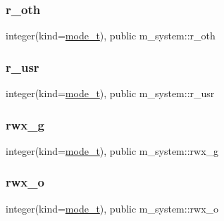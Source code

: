 \mbox{\label{namespacem__system_a144868e3f7e98d339ba59eac96a413b7}} 
\subsubsection{\texorpdfstring{r\+\_\+oth}{r\_oth}}
{\footnotesize\ttfamily integer(kind=\mbox{\hyperlink{namespacem__system_abdb5cc27c945379d844db4830d499050}{mode\+\_\+t}}), public m\+\_\+system\+::r\+\_\+oth}

\mbox{\label{namespacem__system_a26b623dd9e8e115960edbb0f252ccf6b}} 
\subsubsection{\texorpdfstring{r\+\_\+usr}{r\_usr}}
{\footnotesize\ttfamily integer(kind=\mbox{\hyperlink{namespacem__system_abdb5cc27c945379d844db4830d499050}{mode\+\_\+t}}), public m\+\_\+system\+::r\+\_\+usr}

\mbox{\label{namespacem__system_a23010fa4addcb4c58b4cb0334a4fdec0}} 
\subsubsection{\texorpdfstring{rwx\+\_\+g}{rwx\_g}}
{\footnotesize\ttfamily integer(kind=\mbox{\hyperlink{namespacem__system_abdb5cc27c945379d844db4830d499050}{mode\+\_\+t}}), public m\+\_\+system\+::rwx\+\_\+g}

\mbox{\label{namespacem__system_a4a602e6ffd2e4b24dc7d80b5e8db3d02}} 
\subsubsection{\texorpdfstring{rwx\+\_\+o}{rwx\_o}}
{\footnotesize\ttfamily integer(kind=\mbox{\hyperlink{namespacem__system_abdb5cc27c945379d844db4830d499050}{mode\+\_\+t}}), public m\+\_\+system\+::rwx\+\_\+o}

